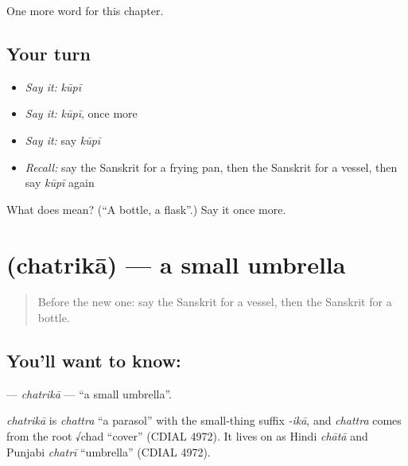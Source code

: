 \begin{grammarlens}[title={What you've built}]
One more word for this chapter.
\end{grammarlens}

\subsection*{Your turn}
\begin{itemize}
\raggedright
  \item \emph{Say it:} \emph{kūpī}
  \item \emph{Say it:} \emph{kūpī}, once more
  \item \emph{Say it:} say \emph{kūpī}
  \item \emph{Recall:} say the Sanskrit for a frying pan, then the Sanskrit for a vessel, then say \emph{kūpī} again
\end{itemize}

\begin{tcolorbox}[breakable,colback=teal!4,colframe=teal!35!black,title={Before you move on}]
What does  mean? (\textquotedblleft{}A bottle, a flask\textquotedblright{}.) Say it once more.
\end{tcolorbox}
\section[\texorpdfstring{\sk{छत्रिका} (chatrikā)}{छत्रिका (chatrikā)}]{ (chatrikā) — a small umbrella}

\label{lesson:SA-C119-chatrika}



\begin{quote}
Before the new one: say the Sanskrit for a vessel, then the Sanskrit for a bottle.
\end{quote}

\subsection*{You'll want to know: }
\textbf{} — \emph{chatrikā} — \textquotedblleft{}a small umbrella\textquotedblright{}.

\begin{cousinweb}
\emph{chatrikā} is \emph{chattra} \textquotedblleft{}a parasol\textquotedblright{} with the small-thing suffix \emph{-ikā}, and \emph{chattra} comes from the root √chad \textquotedblleft{}cover\textquotedblright{} (CDIAL 4972). It lives on as Hindi \emph{chātā} and Punjabi \emph{chatrī} \textquotedblleft{}umbrella\textquotedblright{} (CDIAL 4972).
\end{cousinweb}

